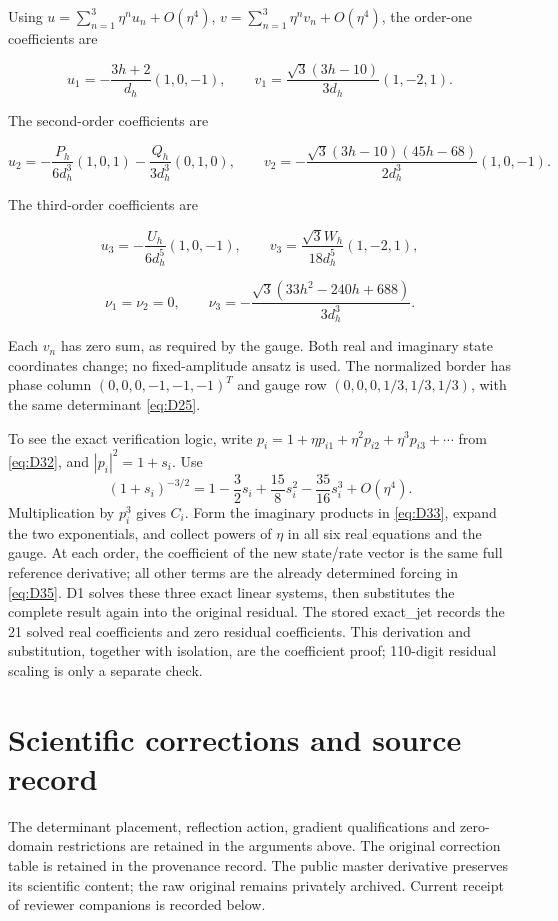 \documentclass[11pt,a4paper]{article}
\begin{document}
Using \(u=\sum_{n=1}^3\eta^n u_n+O(\eta^4)\), \(v=\sum_{n=1}^3\eta^n v_n+O(\eta^4)\), the order-one coefficients are

\[
u_1=-\frac{3h+2}{d_h}(1,0,-1),\qquad
v_1=\frac{\sqrt3(3h-10)}{3d_h}(1,-2,1).
\tag{DA2}\label{eq:DA2}
\]

The second-order coefficients are

\[
u_2=-\frac{P_h}{6d_h^3}(1,0,1)
-\frac{Q_h}{3d_h^3}(0,1,0),\qquad
v_2=-\frac{\sqrt3(3h-10)(45h-68)}{2d_h^3}(1,0,-1).
\tag{DA3}\label{eq:DA3}
\]

The third-order coefficients are

\[
u_3=-\frac{U_h}{6d_h^5}(1,0,-1),\qquad
v_3=\frac{\sqrt3 W_h}{18d_h^5}(1,-2,1),
\tag{DA4}\label{eq:DA4}
\]

\[
\nu_1=\nu_2=0,\qquad
\nu_3=-\frac{\sqrt3(33h^2-240h+688)}{3d_h^3}.
\tag{DA5}\label{eq:DA5}
\]

Each \(v_n\) has zero sum, as required by the gauge. Both real and imaginary state coordinates change; no fixed-amplitude ansatz is used. The normalized border has phase column \((0,0,0,-1,-1,-1)^T\) and gauge row \((0,0,0,1/3,1/3,1/3)\), with the same determinant \eqref{eq:D25}.

To see the exact verification logic, write \(p_i=1+\eta p_{i1}+\eta^2p_{i2}+\eta^3p_{i3}+\cdots\) from \eqref{eq:D32}, and \(|p_i|^2=1+s_i\). Use
\[
(1+s_i)^{-3/2}=1-\frac32s_i+\frac{15}{8}s_i^2-\frac{35}{16}s_i^3+O(\eta^4).
\tag{DA6}\label{eq:DA6}
\]
Multiplication by \(p_i^3\) gives \(C_i\). Form the imaginary products in \eqref{eq:D33}, expand the two exponentials, and collect powers of \(\eta\) in all six real equations and the gauge. At each order, the coefficient of the new state/\allowbreak{}rate vector is the same full reference derivative; all other terms are the already determined forcing in \eqref{eq:D35}. D1 solves these three exact linear systems, then substitutes the complete result again into the original residual. The stored exact\_\allowbreak{}jet records the 21 solved real coefficients and zero residual coefficients. This derivation and substitution, together with isolation, are the coefficient proof; 110-digit residual scaling is only a separate check.

\section{Scientific corrections and source record}

The determinant placement, reflection action, gradient qualifications and zero-domain restrictions are retained in the arguments above. The original correction table is retained in the provenance record. The public master derivative preserves its scientific content; the raw original remains privately archived. Current receipt of reviewer companions is recorded below.
\end{document}
